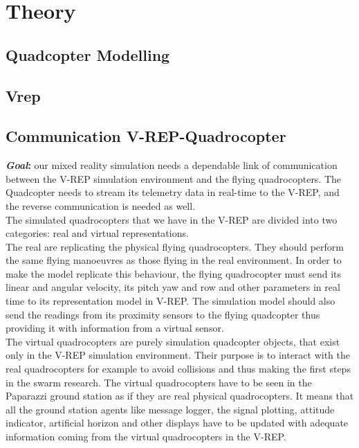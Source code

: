 \chapter{Theory}
\label{sec:theo}


\section{Quadcopter Modelling}





\section{Vrep}





\section{Communication V-REP-Quadrocopter}
\label{sec:comm}
\textbf{\textit{Goal}:} our mixed reality simulation needs a dependable link of communication between the V-REP simulation environment and the flying quadrocopters. The Quadcopter needs to stream its telemetry data in real-time to the V-REP, and the reverse communication is needed as well.\\
The simulated quadrocopters that we have in the V-REP are divided into two categories: real and virtual representations.\\ 
The real are replicating the physical flying quadrocopters. They should perform the same flying manoeuvres as those flying in the real environment. In order to make the model replicate this behaviour, the flying quadrocopter must send its linear and angular velocity, its pitch yaw and row and other parameters in real time to its representation model in V-REP. The simulation model should also send the readings from its proximity sensors to the flying quadcopter thus providing it with information from a virtual sensor. \\
The virtual quadrocopters are purely simulation quadcopter objects, that exist only in the V-REP simulation environment. Their purpose is to interact with the real quadrocopters for example to avoid collisions and thus making the first steps in the swarm research. The virtual quadrocopters have to be seen in the Paparazzi ground station as if they are real physical quadrocopters. It means that all the ground station agents like message logger, the signal plotting, attitude indicator, artificial horizon and other displays have to be updated with adequate information coming from the virtual quadrocopters in the V-REP.

